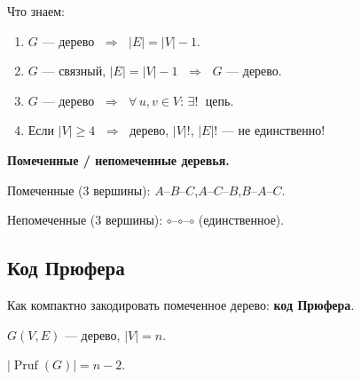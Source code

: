 Что знаем:
\begin{enumerate}
  \item $G$ --- дерево $\;\Rightarrow\;$ $|E| = |V| - 1$.
  \item $G$ --- связный, $|E| = |V| - 1$ $\;\Rightarrow\;$ $G$ --- дерево.
  \item $G$ --- дерево $\;\Rightarrow\;$ $\forall\, u, v \in V$: $\exists!\;$ цепь.
  \item Если $|V| \geq 4$ $\;\Rightarrow\;$ дерево, $|V|!$, $|E|!$ --- не единственно!
\end{enumerate}

\medskip
\noindent\textbf{Помеченные / непомеченные деревья.}

Помеченные (3 вершины):
$A$--$B$--$C$,\quad $A$--$C$--$B$,\quad $B$--$A$--$C$.

Непомеченные (3 вершины): $\circ$--$\circ$--$\circ$ \quad (единственное).


\subsection*{Код Прюфера}

Как компактно закодировать помеченное дерево: \textbf{код Прюфера}.

$G(V, E)$ --- дерево, $|V| = n$.

$|\operatorname{Pruf}(G)| = n - 2$.

